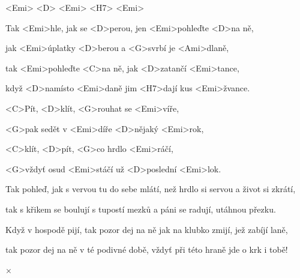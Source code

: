 

<Emi> <D> <Emi> <H7> <Emi>

\zs
Tak <Emi>hle, jak se <D>perou, jen <Emi>pohleďte <D>na ně,

jak <Emi>úplatky <D>berou a <G>svrbí je <Ami>dlaně,

tak <Emi>pohleďte <C>na ně, jak <D>zatančí <Emi>tance,

když <D>namísto <Emi>daně jim <H7>dají kus <Emi>žvance.
\ks

\zr
<C>Pít, <D>klít, <G>rouhat se <Emi>víře,

<G>pak sedět v <Emi>díře <D>nějaký <Emi>rok,

<C>klít, <D>pít, <G>co hrdlo <Emi>ráčí,

<G>vždyť osud <Emi>stáčí už <D>poslední <Emi>lok.
\kr

\zs
Tak pohleď, jak s vervou tu do sebe mlátí, než hrdlo si servou a život si zkrátí,

tak s křikem se boulují s tupostí mezků a páni se radují, utáhnou přezku.
\ks

\zr\kr

\zs
Když v hospodě pijí, tak pozor dej na ně jak na klubko zmijí, jež zabíjí laně,

tak pozor dej na ně v té podivné době, vždyť při této hraně jde o krk i tobě!
\ks

× \kr

\kp
